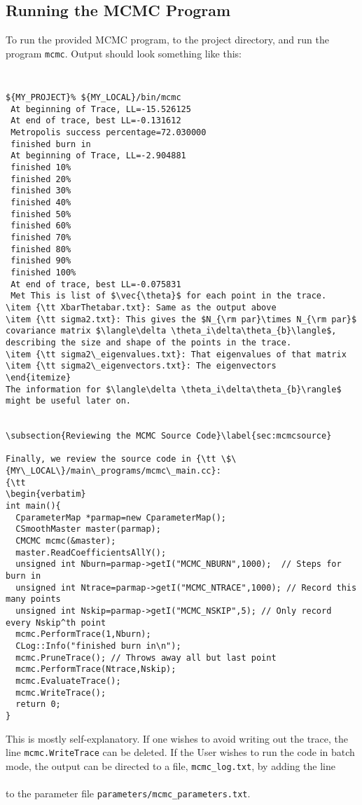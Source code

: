 \documentclass[UserManual.tex]{subfiles}
\begin{document}
\subsection{Running the MCMC Program}
To run the provided MCMC program, to the project directory, and run the program {\tt mcmc}. Output should look something like this:
{\tt
\begin{verbatim}
${MY_PROJECT}% ${MY_LOCAL}/bin/mcmc
 At beginning of Trace, LL=-15.526125
 At end of trace, best LL=-0.131612
 Metropolis success percentage=72.030000
 finished burn in
 At beginning of Trace, LL=-2.904881
 finished 10%
 finished 20%
 finished 30%
 finished 40%
 finished 50%
 finished 60%
 finished 70%
 finished 80%
 finished 90%
 finished 100%
 At end of trace, best LL=-0.075831
 Met This is list of $\vec{\theta}$ for each point in the trace.
\item {\tt XbarThetabar.txt}: Same as the output above
\item {\tt sigma2.txt}: This gives the $N_{\rm par}\times N_{\rm par}$ covariance matrix $\langle\delta \theta_i\delta\theta_{b}\langle$, describing the size and shape of the points in the trace.
\item {\tt sigma2\_eigenvalues.txt}: That eigenvalues of that matrix
\item {\tt sigma2\_eigenvectors.txt}: The eigenvectors
\end{itemize}
The information for $\langle\delta \theta_i\delta\theta_{b}\rangle$ might be useful later on.


\subsection{Reviewing the MCMC Source Code}\label{sec:mcmcsource}

Finally, we review the source code in {\tt \$\{MY\_LOCAL\}/main\_programs/mcmc\_main.cc}:
{\tt
\begin{verbatim}
int main(){
  CparameterMap *parmap=new CparameterMap();
  CSmoothMaster master(parmap);  
  CMCMC mcmc(&master);
  master.ReadCoefficientsAllY();
  unsigned int Nburn=parmap->getI("MCMC_NBURN",1000);  // Steps for burn in
  unsigned int Ntrace=parmap->getI("MCMC_NTRACE",1000); // Record this many points
  unsigned int Nskip=parmap->getI("MCMC_NSKIP",5); // Only record every Nskip^th point  
  mcmc.PerformTrace(1,Nburn);  
  CLog::Info("finished burn in\n");
  mcmc.PruneTrace(); // Throws away all but last point
  mcmc.PerformTrace(Ntrace,Nskip);
  mcmc.EvaluateTrace();
  mcmc.WriteTrace();
  return 0;
}
\end{verbatim}}
This is mostly self-explanatory. If one wishes to avoid writing out the trace, the line {\tt mcmc.WriteTrace} can be deleted. If the User wishes to run the code in batch mode, the output can be directed to a file, {\tt mcmc\_log.txt}, by adding the line\\
\hspace*{20pt}{\tt LogFileName mcmc\_log.txt} \\
to the parameter file {\tt parameters/mcmc\_parameters.txt}.






 
\end{document}
